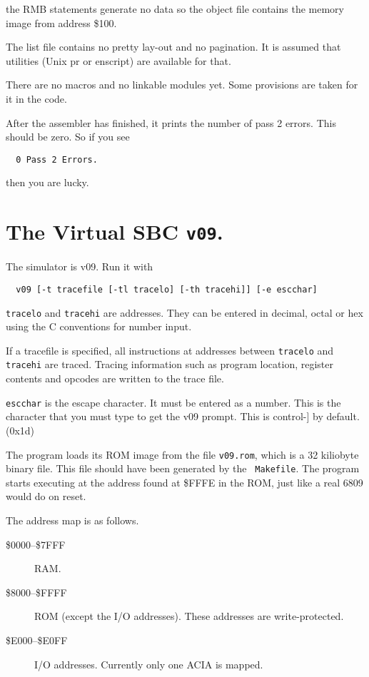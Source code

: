 the RMB statements generate no data so the object file contains the memory
image from address \$100.
     
The list file contains no pretty lay-out and no pagination. It is assumed
that utilities (Unix pr or enscript) are available for that.

There are no macros and no linkable modules yet. Some provisions are taken
for it in the code.

After the assembler has finished, it prints the number of pass 2 errors.
This should be zero. So if you see
\begin{verbatim}
  0 Pass 2 Errors.
\end{verbatim}
then you are lucky.

\chapter{The Virtual SBC {\tt v09}.}

The simulator is v09. Run it with
\begin{verbatim}
  v09 [-t tracefile [-tl tracelo] [-th tracehi]] [-e escchar] 
\end{verbatim}

{\tt tracelo} and {\tt tracehi} are addresses. They can be entered in
decimal, octal or hex using the C conventions for number input.

If a tracefile is specified, all instructions at addresses between
{\tt tracelo} and {\tt tracehi} are traced. Tracing information such as program
location, register contents and opcodes are written to the trace file.

{\tt escchar} is the escape character. It must be entered as a number. This is
the character that you must type to get the v09 prompt. This is control-]
by default. (0x1d)

The program loads its ROM image from the file {\tt v09.rom}, which is a 32
kiliobyte binary file. This file should have been generated by the {\tt
Makefile}. The program starts executing at the address found at \$FFFE in
the ROM, just like a real 6809 would do on reset.

The address map is as follows.
\begin{description}
\item[\$0000--\$7FFF] RAM.
\item[\$8000--\$FFFF] ROM (except the I/O addresses). These addresses are
write-protected.
\item[\$E000--\$E0FF] I/O addresses. Currently only one ACIA is mapped.
\end{description}

